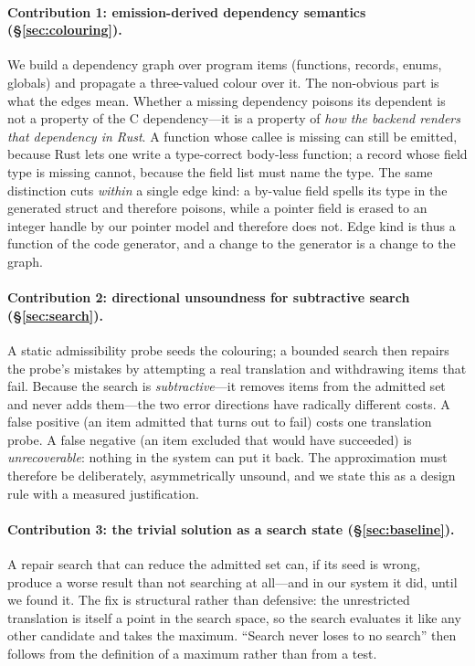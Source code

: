 \documentclass[10pt,twocolumn]{article}
\begin{document}
\paragraph{Contribution 1: emission-derived dependency semantics
(\S\ref{sec:colouring}).} We build a dependency graph over program items
(functions, records, enums, globals) and propagate a three-valued colour over
it. The non-obvious part is what the edges mean. Whether a missing dependency
poisons its dependent is not a property of the C dependency---it is a property
of \emph{how the backend renders that dependency in Rust}. A function whose
callee is missing can still be emitted, because Rust lets one write a
type-correct body-less function; a record whose field type is missing cannot,
because the field list must name the type. The same distinction cuts
\emph{within} a single edge kind: a by-value field spells its type in the
generated struct and therefore poisons, while a pointer field is erased to an
integer handle by our pointer model and therefore does not. Edge kind is thus
a function of the code generator, and a change to the generator is a change to
the graph.

\paragraph{Contribution 2: directional unsoundness for subtractive search
(\S\ref{sec:search}).} A static admissibility probe seeds the colouring; a
bounded search then repairs the probe's mistakes by attempting a real
translation and withdrawing items that fail. Because the search is
\emph{subtractive}---it removes items from the admitted set and never adds
them---the two error directions have radically different costs. A false
positive (an item admitted that turns out to fail) costs one translation
probe. A false negative (an item excluded that would have succeeded) is
\emph{unrecoverable}: nothing in the system can put it back. The approximation
must therefore be deliberately, asymmetrically unsound, and we state this as a
design rule with a measured justification.

\paragraph{Contribution 3: the trivial solution as a search state
(\S\ref{sec:baseline}).} A repair search that can reduce the admitted set can,
if its seed is wrong, produce a worse result than not searching at all---and
in our system it did, until we found it. The fix is structural rather than
defensive: the unrestricted translation is itself a point in the search space,
so the search evaluates it like any other candidate and takes the maximum.
``Search never loses to no search'' then follows from the definition of a
maximum rather than from a test.
\end{document}
